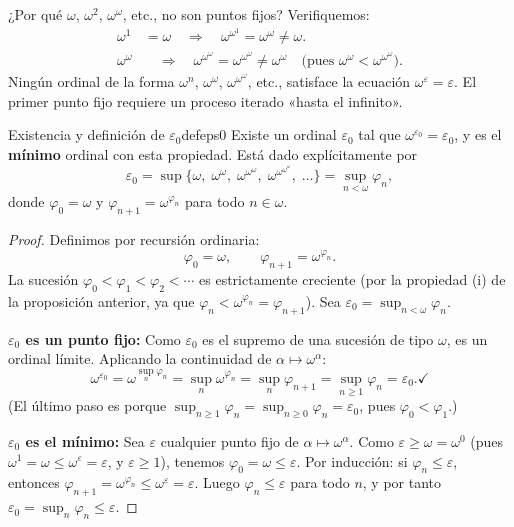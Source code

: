 \begin{importante}
¿Por qué $\omega$, $\omega^2$, $\omega^\omega$, etc., no son puntos fijos? Verifiquemos:
\begin{align*}
  \omega^1 &= \omega \quad\Rightarrow\quad \omega^{\omega^1} = \omega^\omega \neq \omega.\\
  \omega^{\omega} &\quad\Rightarrow\quad \omega^{\omega^\omega} = \omega^{\omega^\omega} \neq \omega^\omega \quad\text{(pues $\omega^\omega < \omega^{\omega^\omega}$)}.
\end{align*}
Ningún ordinal de la forma $\omega^n$, $\omega^\omega$, $\omega^{\omega^\omega}$, etc., satisface la ecuación $\omega^\varepsilon = \varepsilon$. El primer punto fijo requiere un proceso iterado «hasta el infinito».
\end{importante}

\begin{teorema}{Existencia y definición de $\varepsilon_0$}{defeps0}
Existe un ordinal $\varepsilon_0$ tal que $\omega^{\varepsilon_0} = \varepsilon_0$, y es el \textbf{mínimo} ordinal con esta propiedad. Está dado explícitamente por
\[
  \varepsilon_0 = \sup\bigl\{\omega,\; \omega^\omega,\; \omega^{\omega^\omega},\; \omega^{\omega^{\omega^\omega}},\; \ldots\bigr\}
  = \sup_{n < \omega} \varphi_n,
\]
donde $\varphi_0 = \omega$ y $\varphi_{n+1} = \omega^{\varphi_n}$ para todo $n \in \omega$.
\end{teorema}

\begin{proof}
Definimos por recursión ordinaria:
\[
  \varphi_0 = \omega, \qquad \varphi_{n+1} = \omega^{\varphi_n}.
\]
La sucesión $\varphi_0 < \varphi_1 < \varphi_2 < \cdots$ es estrictamente creciente (por la propiedad (i) de la proposición anterior, ya que $\varphi_n < \omega^{\varphi_n} = \varphi_{n+1}$). Sea $\varepsilon_0 = \sup_{n<\omega} \varphi_n$.

\textbf{$\varepsilon_0$ es un punto fijo:} Como $\varepsilon_0$ es el supremo de una sucesión de tipo $\omega$, es un ordinal límite. Aplicando la continuidad de $\alpha \mapsto \omega^\alpha$:
\[
  \omega^{\varepsilon_0}
  = \omega^{\sup_n \varphi_n}
  = \sup_n \omega^{\varphi_n}
  = \sup_n \varphi_{n+1}
  = \sup_{n \geq 1} \varphi_n
  = \varepsilon_0. \checkmark
\]
(El último paso es porque $\sup_{n \geq 1} \varphi_n = \sup_{n \geq 0} \varphi_n = \varepsilon_0$, pues $\varphi_0 < \varphi_1$.)

\textbf{$\varepsilon_0$ es el mínimo:} Sea $\varepsilon$ cualquier punto fijo de $\alpha \mapsto \omega^\alpha$. Como $\varepsilon \geq \omega = \omega^0$ (pues $\omega^1 = \omega \leq \omega^\varepsilon = \varepsilon$, y $\varepsilon \geq 1$), tenemos $\varphi_0 = \omega \leq \varepsilon$. Por inducción: si $\varphi_n \leq \varepsilon$, entonces $\varphi_{n+1} = \omega^{\varphi_n} \leq \omega^\varepsilon = \varepsilon$. Luego $\varphi_n \leq \varepsilon$ para todo $n$, y por tanto $\varepsilon_0 = \sup_n \varphi_n \leq \varepsilon$.
\end{proof}

